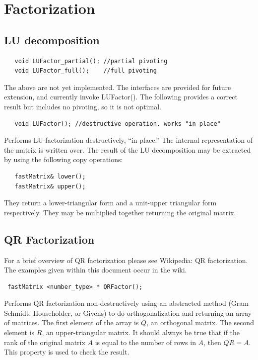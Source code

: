 \documentclass[10pt,fullpage]{article}
\begin{document}
\newpage
\section{Factorization}

\subsection{LU decomposition}

\begin{verbatim}
   void LUFactor_partial(); //partial pivoting
   void LUFactor_full();    //full pivoting
\end{verbatim}

The above are not yet implemented. The interfaces are provided for
future extension, and currently invoke LUFactor(). The following
provides a correct result but includes no pivoting, so it is not
optimal.

\begin{verbatim}
   void LUFactor(); //destructive operation. works "in place"
\end{verbatim}

Performs LU-factorization destructively, ``in place.'' The internal
representation of the matrix is written over. The result of the LU
decomposition may be extracted by using the following copy
operations:

\begin{verbatim}
   fastMatrix& lower();
   fastMatrix& upper();
\end{verbatim}

They return a lower-triangular form and a unit-upper triangular form
respectively. They may be multiplied together returning the original
matrix.

\newpage

\subsection{QR Factorization}

For a brief overview of QR factorization please see Wikipedia: QR
factorization. The examples given within this document occur in the
wiki.

\begin{verbatim}
 fastMatrix <number_type> * QRFactor();
\end{verbatim}

Performs QR factorization non-destructively using an abstracted
method (Gram Schmidt, Householder, or Givens) to do
orthogonalization and returning an array of matrices. The first
element of the array is $Q$, an orthogonal matrix. The second
element is $R$, an upper-triangular matrix. It should always be true
that if the rank of the original matrix $A$ is equal to the number
of rows in $A$, then $QR = A$. This property is used to check the
result.
\end{document}

